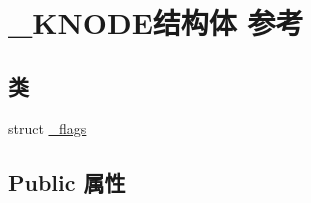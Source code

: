 \hypertarget{struct___k_n_o_d_e}{}\section{\+\_\+\+K\+N\+O\+D\+E结构体 参考}
\label{struct___k_n_o_d_e}
\subsection*{类}
\begin{DoxyCompactItemize}
\item 
struct \hyperlink{struct___k_n_o_d_e_1_1__flags}{\+\_\+flags}
\end{DoxyCompactItemize}
\subsection*{Public 属性}
